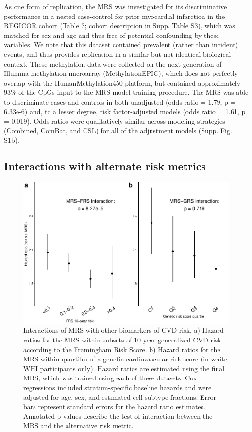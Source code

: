 \documentclass[]{article}
\begin{document}
As one form of replication, the MRS was investigated for its
discriminative performance in a nested case-control for prior myocardial
infarction in the REGICOR cohort (Table 3; cohort description in Supp.
Table S3), which was matched for sex and age and thus free of potential
confounding by these variables. We note that this dataset contained
prevalent (rather than incident) events, and thus provides replication
in a similar but not identical biological context. These methylation
data were collected on the next generation of Illumina methylation
microarray (MethylationEPIC), which does not perfectly overlap with the
HumanMethylation450 platform, but contained approximately 93\% of the
CpGs input to the MRS model training procedure. The MRS was able to
discriminate cases and controls in both unadjusted (odds ratio = 1.79, p
= 6.33e-6) and, to a lesser degree, risk factor-adjusted models (odds
ratio = 1.61, p = 0.019). Odds ratios were qualitatively similar across
modeling strategies (Combined, ComBat, and CSL) for all of the
adjustment models (Supp. Fig. S1b).

\hypertarget{interactions-with-alternate-risk-metrics}{%
\subsection{Interactions with alternate risk
metrics}\label{interactions-with-alternate-risk-metrics}}

\begin{figure}
\centering
\includegraphics{figures/aggregate-interactions-1.pdf}
\caption{Interactions of MRS with other biomarkers of CVD risk. a)
Hazard ratios for the MRS within subsets of 10-year generalized CVD risk
according to the Framingham Risk Score. b) Hazard ratios for the MRS
within quartiles of a genetic cardiovascular risk score (in white WHI
participants only). Hazard ratios are estimated using the final MRS,
which was trained using each of these datasets. Cox regressions included
stratum-specific baseline hazards and were adjusted for age, sex, and
estimated cell subtype fractions. Error bars represent standard errors
for the hazard ratio estimates. Annotated p-values describe the test of
interaction between the MRS and the alternative risk metric.}
\end{figure}
\end{document}
